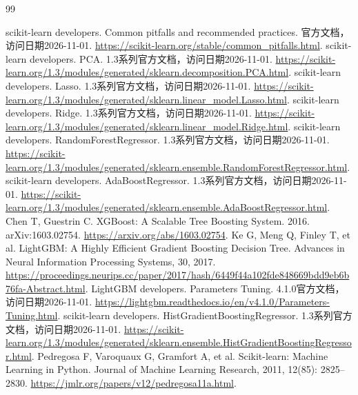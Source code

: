 \begin{thebibliography}{99}
\raggedright
{}
scikit-learn developers. Common pitfalls and recommended practices. 官方文档，访问日期2026-11-01. \url{https://scikit-learn.org/stable/common_pitfalls.html}.
scikit-learn developers. PCA. 1.3系列官方文档，访问日期2026-11-01. \url{https://scikit-learn.org/1.3/modules/generated/sklearn.decomposition.PCA.html}.
scikit-learn developers. Lasso. 1.3系列官方文档，访问日期2026-11-01. \url{https://scikit-learn.org/1.3/modules/generated/sklearn.linear_model.Lasso.html}.
scikit-learn developers. Ridge. 1.3系列官方文档，访问日期2026-11-01. \url{https://scikit-learn.org/1.3/modules/generated/sklearn.linear_model.Ridge.html}.
scikit-learn developers. RandomForestRegressor. 1.3系列官方文档，访问日期2026-11-01. \url{https://scikit-learn.org/1.3/modules/generated/sklearn.ensemble.RandomForestRegressor.html}.
scikit-learn developers. AdaBoostRegressor. 1.3系列官方文档，访问日期2026-11-01. \url{https://scikit-learn.org/1.3/modules/generated/sklearn.ensemble.AdaBoostRegressor.html}.
Chen T, Guestrin C. XGBoost: A Scalable Tree Boosting System. 2016. arXiv:1603.02754. \url{https://arxiv.org/abs/1603.02754}.
Ke G, Meng Q, Finley T, et al. LightGBM: A Highly Efficient Gradient Boosting Decision Tree. Advances in Neural Information Processing Systems, 30, 2017. \url{https://proceedings.neurips.cc/paper/2017/hash/6449f44a102fde848669bdd9eb6b76fa-Abstract.html}.
LightGBM developers. Parameters Tuning. 4.1.0官方文档，访问日期2026-11-01. \url{https://lightgbm.readthedocs.io/en/v4.1.0/Parameters-Tuning.html}.
scikit-learn developers. HistGradientBoostingRegressor. 1.3系列官方文档，访问日期2026-11-01. \url{https://scikit-learn.org/1.3/modules/generated/sklearn.ensemble.HistGradientBoostingRegressor.html}.
Pedregosa F, Varoquaux G, Gramfort A, et al. Scikit-learn: Machine Learning in Python. Journal of Machine Learning Research, 2011, 12(85): 2825--2830. \url{https://jmlr.org/papers/v12/pedregosa11a.html}.
\end{thebibliography}
